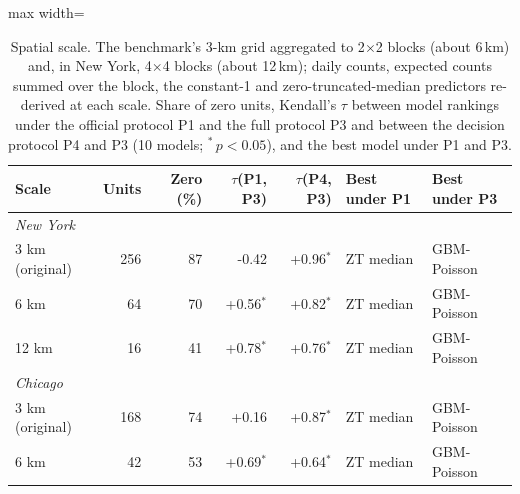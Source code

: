 \begin{table}[!htbp]\centering\small\setlength{\tabcolsep}{4pt}
\caption{Spatial scale. The benchmark's 3-km grid aggregated to 2$\times$2 blocks (about 6\,km) and, in New York, 4$\times$4 blocks (about 12\,km); daily counts, expected counts summed over the block, the constant-1 and zero-truncated-median predictors re-derived at each scale. Share of zero units, Kendall's $\tau$ between model rankings under the official protocol P1 and the full protocol P3 and between the decision protocol P4 and P3 (10 models; $^{*}$\,$p<0.05$), and the best model under P1 and P3.}\label{tab:scale}
\begin{adjustbox}{max width=\linewidth}\begin{tabular}{lrrrrll}\toprule
Scale & Units & Zero (\%) & $\tau$(P1, P3) & $\tau$(P4, P3) & Best under P1 & Best under P3\\\midrule
\multicolumn{7}{l}{\textit{New York}}\\
3 km (original) & 256 & 87 & -0.42 & +0.96$^{*}$ & ZT median & GBM-Poisson \\
6 km & 64 & 70 & +0.56$^{*}$ & +0.82$^{*}$ & ZT median & GBM-Poisson \\
12 km & 16 & 41 & +0.78$^{*}$ & +0.76$^{*}$ & ZT median & GBM-Poisson \\
\midrule
\multicolumn{7}{l}{\textit{Chicago}}\\
3 km (original) & 168 & 74 & +0.16 & +0.87$^{*}$ & ZT median & GBM-Poisson \\
6 km & 42 & 53 & +0.69$^{*}$ & +0.64$^{*}$ & ZT median & GBM-Poisson \\
\bottomrule\end{tabular}\end{adjustbox}\end{table}
